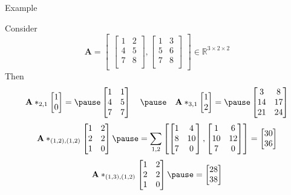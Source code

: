 \documentclass{beamer}
\newcommand{\bvec}[1]{\mathbf{#1}}
\newcommand{\vA}{\bvec{A}}
\begin{document}
\begin{frame}{Example}

Consider
$$
\vA=
\begin{bmatrix}
\begin{bmatrix}
1& 2\\
4& 5\\
7& 8\\
\end{bmatrix}
,
\begin{bmatrix}
1& 3\\
5& 6\\
7& 8\\
\end{bmatrix}
\end{bmatrix}
\in \mathbb{R}^{3 \times 2 \times 2}
$$
Then 
$$
\vA *_{2,1} 
\begin{bmatrix}
1\\ 0    
\end{bmatrix}
=
\pause
\begin{bmatrix}
1 & 1\\
4 & 5\\
7 & 7 \\
\end{bmatrix}
\quad
\pause
\quad 
\vA *_{3,1} 
\begin{bmatrix}
1\\ 2 
\end{bmatrix}
=
\pause
\begin{bmatrix}
3 & 8\\
14 & 17\\
21 & 24
\end{bmatrix}
$$
\pause
$$
\vA *_{(1,2),(1,2)} 
\begin{bmatrix}
1 & 2\\
2 & 2\\
1 & 0\\
\end{bmatrix}
\pause
=
\sum_{1,2}
\begin{bmatrix}
\begin{bmatrix}
1& 4\\
8& 10\\
7& 0\\
\end{bmatrix}
,
\begin{bmatrix}
1& 6\\
10& 12\\
7& 0\\
\end{bmatrix}
\end{bmatrix} 
=
\begin{bmatrix}
30\\
36
\end{bmatrix}
$$
\pause
$$
\vA *_{(1,3),(1,2)} 
\begin{bmatrix}
1 & 2\\
2 & 2\\
1 & 0\\
\end{bmatrix}
\pause
=
\begin{bmatrix}
28\\
38
\end{bmatrix}
$$
\end{frame}
\end{document}
